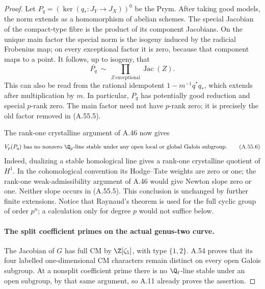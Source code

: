 \begin{proof}
Let \(P_q=(\ker(q_*:J_Y\to J_X))^0\) be the Prym.
After taking good models, the norm extends as a homomorphism of
abelian schemes. The special Jacobian of the compact-type fibre
is the product of its component Jacobians. On the unique main
factor the special norm is the isogeny induced by the radicial
Frobenius map; on every exceptional factor it is zero, because
that component maps to a point. It follows, up to isogeny, that
\[
        \overline{P_q}\ \sim\
           \prod_{Z\ \mathrm{exceptional}}\operatorname{Jac}(Z).
                                                        \tag{A.55.5}
\]
This can also be read from the rational idempotent
\(1-m^{-1}q^*q_*\), which extends after multiplication by \(m\).
In particular, \(P_q\) has potentially good reduction and
special \(p\)-rank zero. The main factor need not have
\(p\)-rank zero; it is precisely the old factor removed in
(A.55.5).

The rank-one crystalline argument of A.46 now gives
\[
 V_p(P_q)\text{ has no nonzero }\Q_p\text{-line stable under
 any open local or global Galois subgroup}.              \tag{A.55.6}
\]
Indeed, dualizing a stable homological line gives a rank-one
crystalline quotient of \(H^1\). In the cohomological convention
its Hodge--Tate weights are zero or one; the rank-one
weak-admissibility argument of A.46 would give Newton slope
zero or one. Neither slope occurs in (A.55.5). This conclusion is unchanged
by further finite extensions. Notice that Raynaud's theorem is
used for the full cyclic group of order \(p^n\); a calculation
only for degree \(p\) would not suffice below.

\paragraph{The split coefficient primes on the actual genus-two curve.}
The Jacobian of \(G\) has full CM by \(\Z[\zeta_5]\), with
type \(\{1,2\}\). A.54 proves that its four labelled
one-dimensional CM characters remain distinct on every open
Galois subgroup. At a nonsplit coefficient prime there is no
\(\Q_\ell\)-line stable under an open subgroup, by that same
argument, so A.11 already proves the assertion.


\end{proof}
